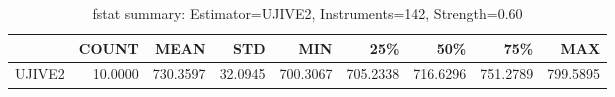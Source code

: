 \begin{table}[ht]
\centering
\caption{fstat summary: Estimator=UJIVE2, Instruments=142, Strength=0.60}
\begin{tabular}{lrrrrrrrr}
\toprule
 & COUNT & MEAN & STD & MIN & 25\% & 50\% & 75\% & MAX \\
\midrule
UJIVE2 & 10.0000 & 730.3597 & 32.0945 & 700.3067 & 705.2338 & 716.6296 & 751.2789 & 799.5895 \\
\bottomrule
\end{tabular}
\end{table}
